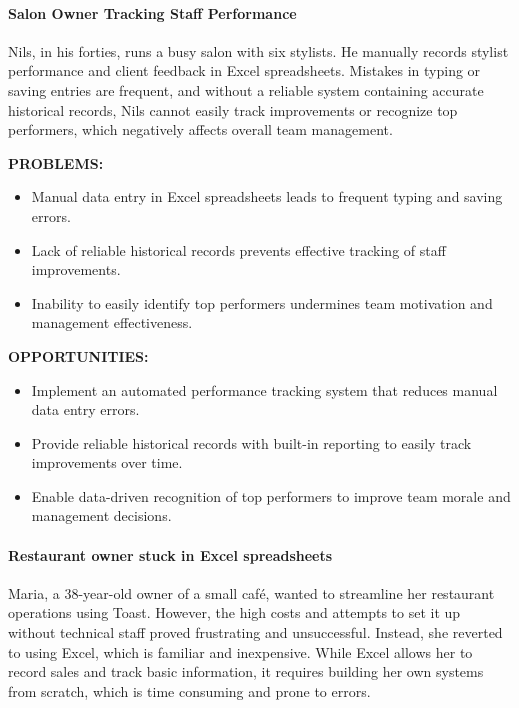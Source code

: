 \documentclass[]{VUMIFTemplateClass}
\newcommand{\subsubsubsection}[1]{\paragraph{#1}}
\begin{document}
\subsubsubsection{Salon Owner Tracking Staff Performance}

Nils, in his forties, runs a busy salon with six stylists. He manually records
stylist performance and client feedback in Excel spreadsheets. Mistakes in
typing or saving entries are frequent, and without a reliable system containing
accurate historical records, Nils cannot easily track improvements or recognize
top performers, which negatively affects overall team management.

\textbf{PROBLEMS:}
\begin{itemize}
    \item Manual data entry in Excel spreadsheets leads to frequent typing and saving errors.
    \item Lack of reliable historical records prevents effective tracking of staff improvements.
    \item Inability to easily identify top performers undermines team motivation and management effectiveness.
\end{itemize}
\textbf{OPPORTUNITIES:}
\begin{itemize}
    \item Implement an automated performance tracking system that reduces manual data entry errors.
    \item Provide reliable historical records with built-in reporting to easily track improvements over time.
    \item Enable data-driven recognition of top performers to improve team morale and management decisions.
\end{itemize}

\subsubsubsection{Restaurant owner stuck in Excel spreadsheets}
Maria, a 38-year-old owner of a small café, wanted to streamline her restaurant
operations using Toast. However, the high costs and attempts to set it up
without technical staff proved frustrating and unsuccessful. Instead, she
reverted to using Excel, which is familiar and inexpensive. While Excel allows
her to record sales and track basic information, it requires building her own
systems from scratch, which is time consuming and prone to errors.
\end{document}
